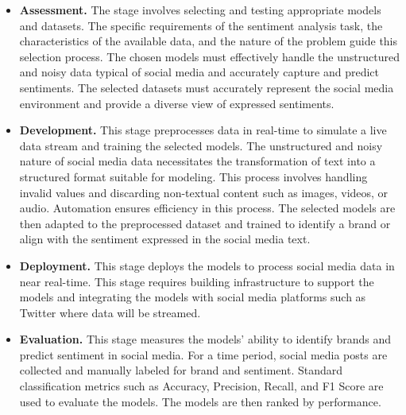 \documentclass{article}
\begin{document}
\begin{itemize}[leftmargin=*]

    \item \textbf{Assessment.} The stage involves selecting and testing
          appropriate models and datasets. The specific requirements of the
          sentiment
          analysis task, the characteristics of the available data, and the
          nature of the
          problem guide this selection process. The chosen models must
          effectively handle
          the unstructured and noisy data typical of social media and
          accurately capture
          and predict sentiments. The selected datasets must accurately
          represent the
          social media environment and provide a diverse view of expressed
          sentiments.

    \item \textbf{Development.} This stage preprocesses data in real-time to
          simulate a live data stream and training the selected models. The
          unstructured
          and noisy nature of social media data necessitates the transformation
          of text
          into a structured format suitable for modeling. This process involves
          handling
          invalid values and discarding non-textual content such as images,
          videos, or
          audio. Automation ensures efficiency in this process. The selected
          models are
          then adapted to the preprocessed dataset and trained to identify a
          brand or
          align with the sentiment expressed in the social media text.

    \item \textbf{Deployment.} This stage deploys the models to process social
          media data in near real-time. This stage requires building
          infrastructure to
          support the models and integrating the models with social media
          platforms such
          as Twitter where data will be streamed.

    \item \textbf{Evaluation.} This stage measures the models' ability to
          identify brands and predict sentiment in social media. For a time
          period,
          social media posts are collected and manually labeled for brand and
          sentiment.
          Standard classification metrics such as Accuracy, Precision, Recall,
          and F1
          Score are used to evaluate the models. The models are then ranked by
          performance.

\end{itemize}
\end{document}
